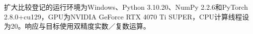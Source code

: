 扩大比较登记的运行环境为Windows、Python 3.10.20、NumPy 2.2.6和PyTorch 2.8.0+cu129，GPU为NVIDIA GeForce RTX 4070 Ti SUPER，CPU计算线程设为20。响应与目标使用双精度实数／复数运算。
